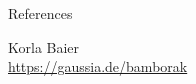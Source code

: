 \begin{block}{References}
\begin{multicols}{2}
\begin{thebibliography}{99}
            Korla Baier\\
            \url{https://gaussia.de/bamborak}\\
            \vspace{1mm}
            \vspace{1mm}
            
        \end{thebibliography}
    \end{multicols}
\end{block}    


